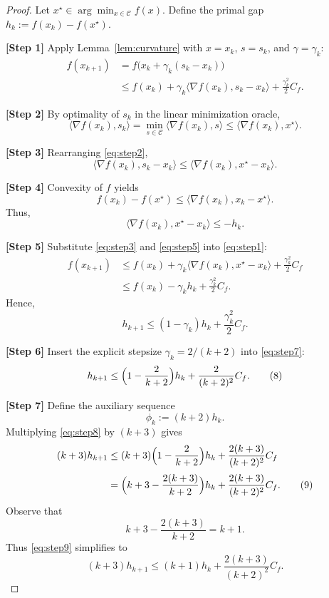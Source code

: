\documentclass{article}
\begin{document}
\begin{proof}
Let $x^\star\in\arg\min_{x\in\mathcal{C}}f(x)$. Define the primal gap $h_k:=f(x_k)-f(x^\star)$.

\medskip
\noindent\textbf{[Step 1]} Apply Lemma~\ref{lem:curvature} with $x=x_k$, $s=s_k$, and $\gamma=\gamma_k$:
\begin{align}
f(x_{k+1}) 
&= f\bigl(x_k+\gamma_k(s_k-x_k)\bigr) \nonumber\\[2pt]
&\le f(x_k)+\gamma_k\langle\nabla f(x_k),s_k-x_k\rangle+\frac{\gamma_k^{2}}{2}C_f .
\tag{1}\label{eq:step1}
\end{align}

\medskip
\noindent\textbf{[Step 2]} By optimality of $s_k$ in the linear minimization oracle,
\[
\langle\nabla f(x_k),s_k\rangle
= \min_{s\in\mathcal{C}}\langle\nabla f(x_k),s\rangle
\le \langle\nabla f(x_k),x^\star\rangle .
\tag{2}\label{eq:step2}
\]

\medskip
\noindent\textbf{[Step 3]} Rearranging \eqref{eq:step2},
\[
\langle\nabla f(x_k),s_k-x_k\rangle
\le \langle\nabla f(x_k),x^\star-x_k\rangle .
\tag{3}\label{eq:step3}
\]

\medskip
\noindent\textbf{[Step 4]} Convexity of $f$ yields
\[
f(x_k)-f(x^\star)\le \langle\nabla f(x_k),x_k-x^\star\rangle .
\tag{4}\label{eq:step4}
\]
Thus,
\[
\langle\nabla f(x_k),x^\star-x_k\rangle\le -h_k .
\tag{5}\label{eq:step5}
\]

\medskip
\noindent\textbf{[Step 5]} Substitute \eqref{eq:step3} and \eqref{eq:step5} into \eqref{eq:step1}:
\begin{align}
f(x_{k+1})
&\le f(x_k)+\gamma_k\bigl\langle\nabla f(x_k),x^\star-x_k\bigr\rangle+\frac{\gamma_k^{2}}{2}C_f \nonumber\\[2pt]
&\le f(x_k)-\gamma_k h_k+\frac{\gamma_k^{2}}{2}C_f .
\tag{6}\label{eq:step6}
\end{align}
Hence,
\[
h_{k+1}\le (1-\gamma_k)h_k+\frac{\gamma_k^{2}}{2}C_f .
\tag{7}\label{eq:step7}
\]

\medskip
\noindent\textbf{[Step 6]} Insert the explicit stepsize $\gamma_k=2/(k+2)$ into \eqref{eq:step7}:
\[
h_{k+1}
\le \Bigl(1-\frac{2}{k+2}\Bigr)h_k+\frac{2}{(k+2)^2}C_f .
\tag{8}\label{eq:step8}
\]

\medskip
\noindent\textbf{[Step 7]} Define the auxiliary sequence
\[
\phi_k:=(k+2)h_k .
\]
Multiplying \eqref{eq:step8} by $(k+3)$ gives
\begin{align}
(k+3)h_{k+1}
&\le (k+3)\Bigl(1-\frac{2}{k+2}\Bigr)h_k+\frac{2(k+3)}{(k+2)^2}C_f \nonumber\\[2pt]
&= \Bigl(k+3-\frac{2(k+3)}{k+2}\Bigr)h_k+\frac{2(k+3)}{(k+2)^2}C_f .
\tag{9}\label{eq:step9}
\end{align}
Observe that
\[
k+3-\frac{2(k+3)}{k+2}=k+1 .
\tag{10}\label{eq:step10}
\]
Thus \eqref{eq:step9} simplifies to
\[
(k+3)h_{k+1}\le (k+1)h_k+\frac{2(k+3)}{(k+2)^2}C_f .
\tag{11}\label{eq:step11}
\]


\end{proof}
\end{document}
